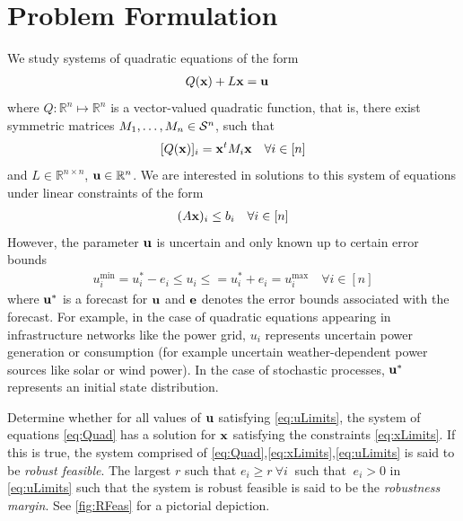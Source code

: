 \section{Problem Formulation} \label{sec:probform}  

We study systems of quadratic equations of the form
\begin{align}
& Q(\mathbf{x})+L\mathbf{x}=\mathbf{u}\label{eq:Quad}
\end{align}
where $Q: \mathbb{R}^n \mapsto \mathbb{R}^n$ is a vector-valued quadratic function, that is, there exist symmetric matrices $M_1,\ldots,M_n \in \mathcal{S}^{n}$, such that
\[[Q(\mathbf{x})]_i = \mathbf{x}^t M_{i} \mathbf{x} \quad \forall i \in [n]\]
and $L \in \mathbb{R}^{n\times n}$, $\mathbf{u} \in \mathbb{R}^n$. 
We are interested in solutions to this system of equations under linear constraints of the form
\begin{align}
(A\mathbf{x})_i\leq b_i \quad \forall i \in [n]\label{eq:xLimits}
\end{align}
However, the parameter $\mathbf{u}$ is uncertain and only known up to certain error bounds
\begin{align}
u^{\min}_i=u_i^*-e_i \leq u_i \leq =u_i^*+e_i=u^{\max}_i \quad \forall i \in [n] \label{eq:uLimits}
\end{align}
where $\mathbf{u}^*$ is a forecast for $\mathbf{u}$ and $\mathbf{e}$ denotes the error bounds associated with the forecast. 
For example, in the case of quadratic equations appearing in infrastructure networks like the power grid, $u_i$ represents uncertain power generation or consumption (for example uncertain weather-dependent power sources like solar or wind power). 
In the case of stochastic processes, $\mathbf{u}^*$ represents an initial state distribution.

\begin{cdef}  \label{RobustDef}
Determine whether for all values of $\mathbf{u}$ satisfying \eqref{eq:uLimits}, the system of equations \eqref{eq:Quad} has a solution for $\mathbf{x}$ satisfying the constraints \eqref{eq:xLimits}. 
If this is true, the system comprised of \eqref{eq:Quad},\eqref{eq:xLimits},\eqref{eq:uLimits} is said to be \emph{robust feasible}. 
The largest $r$ such that $e_i\geq r \ \forall i~$ such that $~e_i>0$ in \eqref{eq:uLimits} such that the system is robust feasible is said to be the \emph{robustness margin}. 
See \cref{fig:RFeas} for a pictorial depiction. 
\end{cdef}

